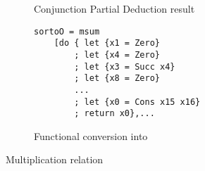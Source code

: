 \begin{figure}[!t]
\begin{subfigure}[b]{0.45\textwidth}
\begin{lstlisting}[frame=tb, mathescape=true]
    \end{lstlisting}
    \caption{Conjunction Partial Deduction result}
    \label{fig:sortDeduced}
  \end{subfigure}
\hfill
  \begin{subfigure}[b]{0.45\textwidth}
    \begin{lstlisting}[frame=tb, mathescape=true]
sortoO = msum 
    [do { let {x1 = Zero}
        ; let {x4 = Zero}
        ; let {x3 = Succ x4}
        ; let {x8 = Zero}
        ...
        ; let {x0 = Cons x15 x16}
        ; return x0},...
    \end{lstlisting}
    \caption{Functional conversion into \haskell}
    \label{fig:sortHaskell}
  \end{subfigure}

  \caption{Multiplication relation}
  \label{fig:sort}
\end{figure}